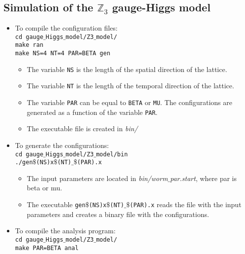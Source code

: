 \documentclass[a4paper,10pt]{report}
\begin{document}
\subsection*{Simulation of the $\mathds{Z}_3$ gauge-Higgs model}
\begin{itemize}[leftmargin=*]
 \item To compile the configuration files:
 \vspace*{2mm}
 \texttt{
 \\cd gauge$\_$Higgs$\_$model/Z3$\_$model/
 \\make ran   
 \\make NS=4 NT=4 PAR=BETA gen
 }

 \begin{itemize}[leftmargin=*]
  \item The variable {\tt NS} is the length of the spatial direction of the lattice.
  \item The variable {\tt NT} is the length of the temporal direction of the lattice.
  \item The variable {\tt PAR} can be equal to {\tt BETA} or {\tt MU}.
  The configurations are generated as a function of the variable {\tt PAR}.
  \item The executable file is created in {\it bin/}
 \end{itemize}
 
 \item To generate the configurations:
 \vspace*{2mm}
 \texttt{
 \\cd gauge$\_$Higgs$\_$model/Z3$\_$model/bin
 \\./gen$\$$(NS)x$\$$(NT)$\_\$$(PAR).x   
 }

 \begin{itemize}[leftmargin=*]
  \item The input parameters are located in {\it bin/worm$\_$par.start}, where par is beta or mu.
  \item The executable {\tt gen$\$$(NS)x$\$$(NT)$\_\$$(PAR).x} reads the file with the input parameters and creates
  a binary file with the configurations.
 \end{itemize}
 
 
 
 \item To compile the analysis program:
 \vspace*{2mm}
 \texttt{
 \\cd gauge$\_$Higgs$\_$model/Z3$\_$model/
 \\make PAR=BETA anal
 }


\end{itemize}
\end{document}
